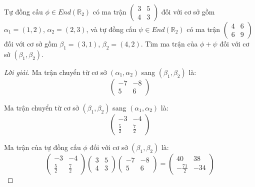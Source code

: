 \documentclass[class=linearalgebra,crop=false]{standalone}
\begin{document}
\begin{exercise}
    Tự đồng cấu $\phi\in End(\mathbb{R}_{2})$ có ma trận $\begin{pmatrix}3 & 5 \\ 4 & 3\end{pmatrix}$ đối với cơ sở gồm $\alpha_{1} = (1, 2)$, $\alpha_{2} = (2, 3)$, và tự đồng cấu $\psi\in End(\mathbb{R}_{2})$ có ma trận $\begin{pmatrix}4 & 6 \\ 6 & 9 \end{pmatrix}$ đối với cơ sở gồm $\beta_{1} = (3, 1)$, $\beta_{2} = (4, 2)$. Tìm ma trận của $\phi + \psi$ đối với cơ sở $(\beta_{1}, \beta_{2})$.
\end{exercise}

\begin{proof}[Lời giải]
    \par Ma trận chuyển từ cơ sở $(\alpha_{1}, \alpha_{2})$ sang $(\beta_{1}, \beta_{2})$ là:
    \[
        \begin{pmatrix}
            -7 & -8 \\
            5  & 6
        \end{pmatrix}
    \]
    \par Ma trận chuyển từ cơ sở $(\beta_{1}, \beta_{2})$ sang $(\alpha_{1}, \alpha_{2})$ là:
    \[
        \begin{pmatrix}
            -3          & -4          \\
            \frac{5}{2} & \frac{7}{2}
        \end{pmatrix}
    \]
    \par Ma trận của tự đồng cấu $\phi$ đối với cơ sở $(\beta_{1}, \beta_{2})$ là:
    \[
        \begin{pmatrix}
            -3          & -4          \\
            \frac{5}{2} & \frac{7}{2}
        \end{pmatrix}
        \begin{pmatrix}
            3 & 5 \\
            4 & 3
        \end{pmatrix}
        \begin{pmatrix}
            -7 & -8 \\
            5  & 6
        \end{pmatrix}
        =
        \begin{pmatrix}
            40            & 38  \\
            -\frac{71}{2} & -34
        \end{pmatrix}
\]
\end{proof}
\end{document}
